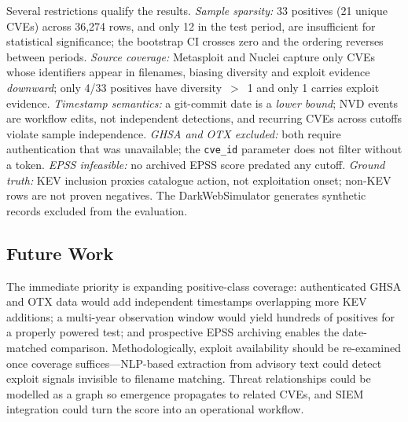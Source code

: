 \documentclass[conference]{IEEEtran}
\begin{document}
Several restrictions qualify the results. \textit{Sample sparsity:} 33 positives (21 unique CVEs) across 36{,}274 rows, and only 12 in the test period, are insufficient for statistical significance; the bootstrap CI crosses zero and the ordering reverses between periods. \textit{Source coverage:} Metasploit and Nuclei capture only CVEs whose identifiers appear in filenames, biasing diversity and exploit evidence \emph{downward}; only 4/33 positives have diversity~$>$~1 and only 1 carries exploit evidence. \textit{Timestamp semantics:} a git-commit date is a \emph{lower bound}; NVD events are workflow edits, not independent detections, and recurring CVEs across cutoffs violate sample independence. \textit{GHSA and OTX excluded:} both require authentication that was unavailable; the \texttt{cve\_id} parameter does not filter without a token. \textit{EPSS infeasible:} no archived EPSS score predated any cutoff. \textit{Ground truth:} KEV inclusion proxies catalogue action, not exploitation onset; non-KEV rows are not proven negatives. The DarkWebSimulator generates synthetic records excluded from the evaluation.

\subsection{Future Work}
The immediate priority is expanding positive-class coverage: authenticated GHSA and OTX data would add independent timestamps overlapping more KEV additions; a multi-year observation window would yield hundreds of positives for a properly powered test; and prospective EPSS archiving enables the date-matched comparison. Methodologically, exploit availability should be re-examined once coverage suffices---NLP-based extraction from advisory text could detect exploit signals invisible to filename matching. Threat relationships could be modelled as a graph so emergence propagates to related CVEs, and SIEM integration could turn the score into an operational workflow.
\end{document}
